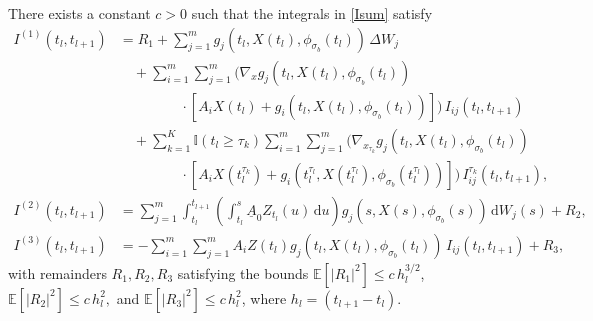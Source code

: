 \documentclass[onefignum]{siamart250211}
\providecommand{\abs}[1]{\left|#1\right|}
\begin{document}
\begin{lemma}\label{NewLemma2}
There exists a constant $c>0$ such that the integrals in \cref{Isum} satisfy
\begin{align}
I^{(1)}(t_l,t_{l+1})&=R_1+\sum_{j=1}^mg_j(t_l,X(t_l),\phi_{\sigma_b}(t_l))\,\Delta W_j\label{I1}\\
&\quad+\sum_{i=1}^m\sum_{j=1}^m\bigg(\nabla_xg_j(t_l,X(t_l),\phi_{\sigma_b}(t_l))\nonumber\\
&\quad\quad\hspace{1cm}\cdot[A_iX(t_l)+g_i(t_l,X(t_l),\phi_{\sigma_b}(t_l))]\bigg)\,I_{ij}(t_l,t_{l+1})\nonumber\\
&\quad+\sum_{k=1}^K\mathbb{I}(t_l\geqslant\tau_k)\sum_{i=1}^m\sum_{j=1}^m\bigg(\nabla_{x_{\tau_k}}g_j(t_l,X(t_l),\phi_{\sigma_b}(t_l))\nonumber\\
&\quad\quad\hspace{1cm}\cdot[A_iX(t_l^{\tau_k})+g_i(t_l^{\tau_l},X(t_l^{\tau_l}),\phi_{\sigma_b}(t_l^{\tau_l}))]\bigg)\,I_{ij}^{\tau_k}(t_l,t_{l+1}),\nonumber\\
I^{(2)}(t_l,t_{l+1})&=\sum_{j=1}^m\int_{t_l}^{t_{l+1}}\left(\int_{t_l}^s\underline{A}_0Z_{t_l}(u)\,\mathrm{d}u\right)g_j(s,X(s),\phi_{\sigma_b}(s))\,\mathrm{d}W_j(s)+R_2,\label{I2}\\
I^{(3)}(t_l,t_{l+1})&=-\sum_{i=1}^m\sum_{j=1}^mA_iZ(t_l)g_j(t_l,X(t_l),\phi_{\sigma_b}(t_l))\,I_{ij}(t_l,t_{l+1})+R_3,\label{I3}
\end{align}
with remainders $R_1,R_2,R_3$ satisfying the bounds $\mathbb{E}[\abs{R_1}^2]\leqslant c\,h_l^{3/2}$, $\mathbb{E}[\abs{R_2}^2]\leqslant c\,h_l^2,$ and $\mathbb{E}[\abs{R_3}^2]\leqslant c\,h_l^2$, where $h_l=(t_{l+1}-t_l)$.
\end{lemma}
\end{document}

